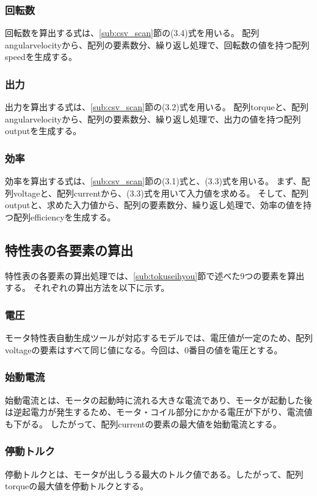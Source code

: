 \subsubsection{回転数}\label{sub:sub:kaiten}
回転数を算出する式は、\ref{sub:csv_scan}節の(3.4)式を用いる。
配列angularvelocityから、配列の要素数分、繰り返し処理で、回転数の値を持つ配列speedを生成する。
\subsubsection{出力}\label{sub:sub:syutu}
出力を算出する式は、\ref{sub:csv_scan}節の(3.2)式を用いる。
配列torqueと、配列angularvelocityから、配列の要素数分、繰り返し処理で、出力の値を持つ配列outputを生成する。
\subsubsection{効率}\label{sub:sub:kouritu}
効率を算出する式は、\ref{sub:csv_scan}節の(3.1)式と、(3.3)式を用いる。
まず、配列voltageと、配列currentから、(3.3)式を用いて入力値を求める。
そして、配列outputと、求めた入力値から、配列の要素数分、繰り返し処理で、効率の値を持つ配列efficiencyを生成する。
\subsection{特性表の各要素の算出}\label{sub:youso_mortoku}
特性表の各要素の算出処理では、\ref{sub:tokuseihyou}節で述べた9つの要素を算出する。
それぞれの算出方法を以下に示す。
\subsubsection{電圧}\label{sub:sub:dennatu}
モータ特性表自動生成ツールが対応するモデルでは、電圧値が一定のため、配列voltageの要素はすべて同じ値になる。今回は、0番目の値を電圧とする。
\subsubsection{始動電流}\label{sub:sub:sidouden}
始動電流とは、モータの起動時に流れる大きな電流であり、モータが起動した後は逆起電力が発生するため、モータ・コイル部分にかかる電圧が下がり、電流値も下がる。
したがって、配列currentの要素の最大値を始動電流とする。
\subsubsection{停動トルク}\label{sub:sub:teidoutoruku}
停動トルクとは、モータが出しうる最大のトルク値である。したがって、配列torqueの最大値を停動トルクとする。
